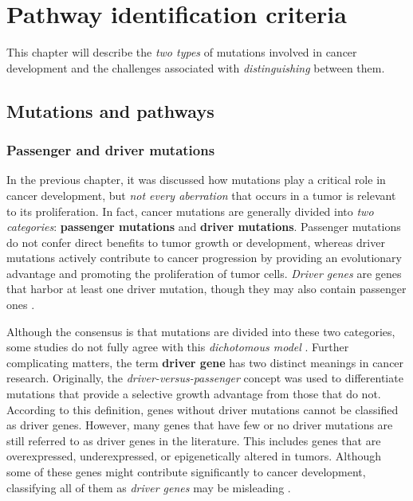 \chapter{Pathway identification criteria} \label{chap:pathway_identification_criteria}

This chapter will describe the \textit{two types} of mutations involved in cancer development and the challenges associated with \textit{distinguishing} between them.

\section{Mutations and pathways}

\subsection{Passenger and driver mutations}

In the previous chapter, it was discussed how mutations play a critical role in cancer development, but \textit{not every aberration} that occurs in a tumor is relevant to its proliferation. In fact, cancer mutations are generally divided into \textit{two categories}: \textbf{passenger mutations} and \textbf{driver mutations}. Passenger mutations do not confer direct benefits to tumor growth or development, whereas driver mutations actively contribute to cancer progression by providing an evolutionary advantage and promoting the proliferation of tumor cells. \textit{Driver genes} are genes that harbor at least one driver mutation, though they may also contain passenger ones \cite{vogelstein2013}.

Although the consensus is that mutations are divided into these two categories, some studies do not fully agree with this \textit{dichotomous model} \cite{three_mutations}. Further complicating matters, the term \textbf{driver gene} has two distinct meanings in cancer research. Originally, the \textit{driver-versus-passenger} concept was used to differentiate mutations that provide a selective growth advantage from those that do not. According to this definition, genes without driver mutations cannot be classified as driver genes. However, many genes that have few or no driver mutations are still referred to as driver genes in the literature. This includes genes that are overexpressed, underexpressed, or epigenetically altered in tumors. Although some of these genes might contribute significantly to cancer development, classifying all of them as \textit{driver genes} may be misleading \cite{vogelstein2013}.

